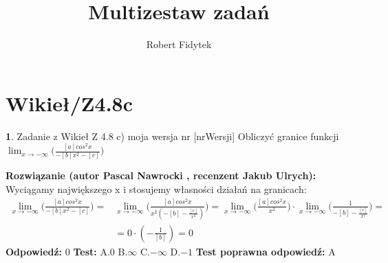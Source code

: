 \documentclass[12pt, a4paper]{article}
\title{Multizestaw zadań}
\author{Robert Fidytek}
\date{}
\theoremstyle{definition} %
\newtheorem{zad}{}
\newcommand{\kategoria}[1]{\section{#1}} %
\newcommand{\zadStart}[1]{\begin{zad}#1\newline} %
\newcommand{\zadStop}{\end{zad}}   %
\newcommand{\rozwStart}[2]{\noindent \textbf{Rozwiązanie (autor #1 , recenzent #2): }\newline} %
\newcommand{\rozwStop}{\newline}                                            %
\newcommand{\odpStart}{\noindent \textbf{Odpowiedź:}\newline}    %
\newcommand{\odpStop}{\newline}                                             %
\newcommand{\testStart}{\noindent \textbf{Test:}\newline} %
\newcommand{\testStop}{\newline} %
\newcommand{\kluczStart}{\noindent \textbf{Test poprawna odpowiedź:}\newline} %
\newcommand{\kluczStop}{\newline} %
\begin{document}
\maketitle


\kategoria{Wikieł/Z4.8c}
\zadStart{Zadanie z Wikieł Z 4.8 c) moja wersja nr [nrWersji]}
Obliczyć granice funkcji $\displaystyle{\lim_{x \to -\infty}}\bigg(\frac{[a]cos^2x}{-[b]x^2-[c]}\bigg)$
\zadStop
\rozwStart{Pascal Nawrocki}{Jakub Ulrych}
Wyciągamy największego x i stosujemy własności działań na granicach:
\begin{equation}
\begin{split}
\displaystyle{\lim_{x \to -\infty}}\bigg(\frac{[a]cos^2x}{-[b]x^2-[c]}\bigg)=&\displaystyle{\lim_{x \to -\infty}}\bigg(\frac{[a]cos^2x}{x^2(-[b]-\frac{[c]}{x^2})}\bigg)=\displaystyle{\lim_{x \to -\infty}}\bigg(\frac{[a]cos^2x}{x^2}\bigg)\cdot\displaystyle{\lim_{x \to -\infty}}\bigg(\frac{1}{-[b]-\frac{[c]}{x^2}}\bigg)=\\&=0\cdot(-\frac{1}{[b]})=0
\end{split}
\end{equation}
\rozwStop
\odpStart
$0$
\odpStop
\testStart
A.$0$
B.$\infty$
C.$-\infty$
D.$-1$
\testStop
\kluczStart
A
\kluczStop
\end{document}
